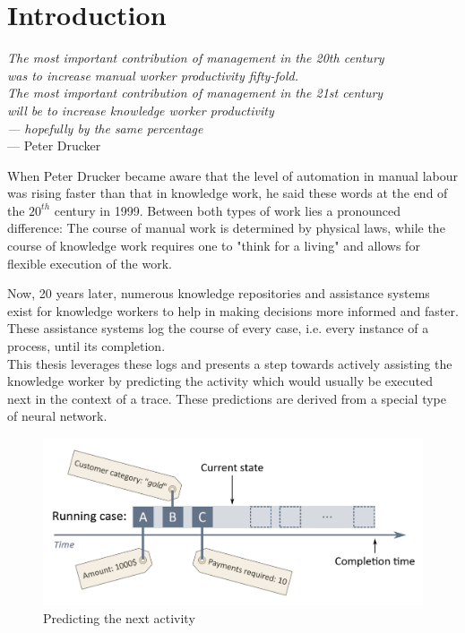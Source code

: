\chapter{Introduction}\label{sec:intro}
\begin{flushright}{\slshape    
The most important contribution of management in the 20th century\\
was to increase manual worker productivity fifty-fold.\\
The most important contribution of management in the 21st century\\
will be to increase knowledge worker productivity\\
— hopefully by the same percentage} \\ \medskip
--- Peter Drucker~\cite{drucker1999}
\end{flushright}

When Peter Drucker became aware that the level of automation in manual labour was rising faster than that in knowledge work, he said these words at the end of the $20^{th}$ century in 1999. Between both types of work lies a pronounced difference: The course of manual work is determined by physical laws, while the course of knowledge work requires one to "think for a living" and allows for flexible execution of the work.

Now, 20 years later, numerous knowledge repositories and assistance systems exist for knowledge workers to help in making decisions more informed and faster. These assistance systems log the course of every case, i.e. every instance of a process, until its completion.\\

This thesis leverages these logs and presents a step towards actively assisting the knowledge worker by predicting the activity which would usually be executed next in the context of a trace. These predictions are derived from a special type of neural network.\\

\begin{figure}
    \centering
    \includegraphics[width=\textwidth]{gfx/next-activity.png}
    \caption{Predicting the next activity}
    \label{fig:next-activity-prediction}
\end{figure}

